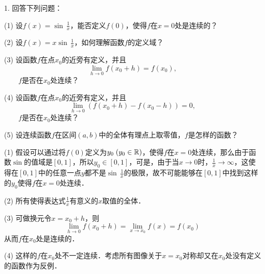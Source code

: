 \exercise

1. 回答下列问题：

\begin{minipage}[l]{0.8\textwidth}
    \setlength{\leftskip}{0.5em}

    \medskip
    (1) 设$f(x)=\sin \, \displaystyle\frac{1}{x}$，能否定义$f(0)$，使得$f$在$x=0$处是连续的？
    \medskip

    (2) 设$f(x)=x \sin \, \displaystyle\frac{1}{x}$，如何理解函数$f$的定义域？
    \medskip

    (3) 设函数$f$在点$x_0$的近旁有定义，并且
    \begin{equation*}
        \lim_{h \to 0} f(x_0 + h) = f(x_0),
    \end{equation*}
    ~~~~$f$是否在$x_0$处连续？
    \medskip

    (4) 设函数$f$在点$x_0$的近旁有定义，并且
    \begin{equation*}
        \lim_{h \to 0} \left(f(x_0+h)-f(x_0-h)\right)=0,
    \end{equation*}
    ~~~~$f$是否在$x_0$处连续？
    \medskip

    (5) 设连续函数$f$在区间$(a,b)$中的全体有理点上取零值，$f$是怎样的函数？
\end{minipage}
\bigskip

(1) \answer 假设可以通过将$f(0)$定义为$y_0 \;(y_0 \in \mathbb{R})$，使得$f$在$x=0$处连续，那么由于函数$\sin$的值域是$[0,1]$，所以$y_0 \in [0,1]$，可是，由于当$x \to 0$时，$\displaystyle\frac{1}{x} \to \infty$，这使得在$[0,1]$中的任意一点$y$都不是$\sin \, \displaystyle\frac{1}{x}$的极限，故不可能能够在$[0,1]$中找到这样的$y_0$使得$f$在$x=0$处连续．
\bigskip

(2) \answer 所有使得表达式$\displaystyle\frac{1}{x}$有意义的$x$取值的全体．
\bigskip

(3) \answer 可做换元令$x = x_0 + h$，则
\begin{equation}
    \lim_{h \to 0} f(x_0 + h) = \lim_{x \to x_0} f(x) = f(x_0)
\end{equation}
从而$f$在$x_0$处是连续的．

(4) \answer 这样的$f$在$x_0$处不一定连续．考虑所有图像关于$x = x_0$对称却又在$x_0$处没有定义的函数作为反例．
\bigskip

